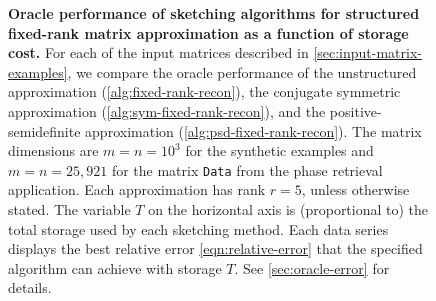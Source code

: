 \documentclass[final]{siamart1116}
\numberwithin{equation}{section}
\numberwithin{theorem}{section}
\numberwithin{figure}{section}
\begin{document}
\begin{figure}[htp!]
\caption{\textbf{Oracle performance of sketching algorithms for structured fixed-rank matrix approximation
as a function of storage cost.} For each of the input matrices described in \cref{sec:input-matrix-examples},
we compare the oracle performance of the unstructured approximation (\cref{alg:fixed-rank-recon}),
the conjugate symmetric approximation (\cref{alg:sym-fixed-rank-recon}),
and the positive-semidefinite approximation (\cref{alg:psd-fixed-rank-recon}).
The matrix dimensions are $m = n = 10^3$ for the synthetic examples
and $m = n = 25,921$ for the matrix \texttt{Data}
from the phase retrieval application.  Each approximation has rank $r = 5$, unless otherwise stated.
The variable $T$ on the horizontal axis is (proportional to) the total storage used by each
sketching method.  Each data series displays the best relative error
\cref{eqn:relative-error} that the specified algorithm can achieve with storage $T$.
See \cref{sec:oracle-error} for details.}
\label{fig:oracle-structured}
\end{figure}
\end{document}
